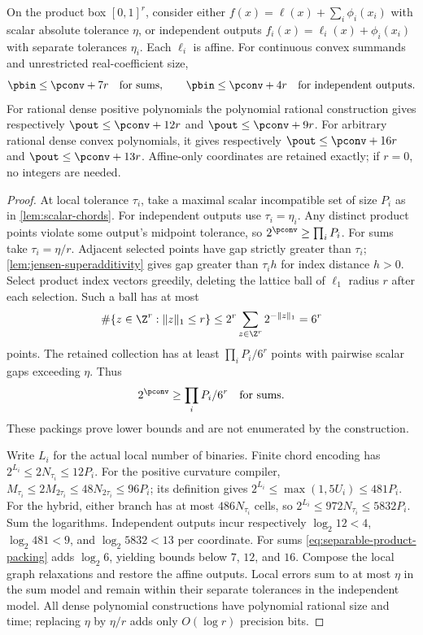 \begin{theorem}\label{thm:separable-scalar}
On the product box $[0,1]^r$, consider either
$f(x)=\ell(x)+\sum_i\phi_i(x_i)$ with scalar absolute tolerance
$\eta$, or independent outputs $f_i(x)=\ell_i(x)+\phi_i(x_i)$
with separate tolerances $\eta_i$. Each $\ell_i$ is affine. For
continuous convex summands and unrestricted real-coefficient size,
\begin{equation}\label{eq:separable-finite-counts}
 \pbin\le\pconv+7r\quad\text{for sums},\qquad
 \pbin\le\pconv+4r\quad\text{for independent outputs}.
\end{equation}
For rational dense positive polynomials the polynomial rational
construction gives respectively $\pout\le\pconv+12r$ and
$\pout\le\pconv+9r$. For arbitrary rational dense convex polynomials,
it gives respectively $\pout\le\pconv+16r$ and
$\pout\le\pconv+13r$. Affine-only coordinates are retained exactly;
if $r=0$, no integers are needed.
\end{theorem}
\begin{proof}
At local tolerance $\tau_i$, take a maximal scalar incompatible set
of size $P_i$ as in \cref{lem:scalar-chords}. For independent outputs
use $\tau_i=\eta_i$. Any distinct product points violate some output's
midpoint tolerance, so $2^{\pconv}\ge\prod_iP_i$.
For sums take $\tau_i=\eta/r$. Adjacent selected points have gap
strictly greater than $\tau_i$; \cref{lem:jensen-superadditivity}
gives gap greater than $\tau_i h$ for index distance $h>0$.
Select product index vectors greedily, deleting the lattice ball of
$\ell_1$ radius $r$ after each selection. Such a ball has at most
\[
 \#\{z\in\Z^r:\|z\|_1\le r\}
 \le2^r\sum_{z\in\Z^r}2^{-\|z\|_1}=6^r
\]
points. The retained collection has at least $\prod_iP_i/6^r$
points with pairwise scalar gaps exceeding $\eta$. Thus
\begin{equation}\label{eq:separable-product-packing}
 2^{\pconv}\ge\prod_iP_i/6^r\quad\text{for sums}.
\end{equation}
These packings prove lower bounds and are not enumerated by the
construction.

Write $L_i$ for the actual local number of binaries. Finite chord
encoding has $2^{L_i}\le2N_{\tau_i}\le12P_i$. For the positive
curvature compiler,
$M_{\tau_i}\le2M_{2\tau_i}\le48N_{2\tau_i}\le96P_i$;
its definition gives $2^{L_i}\le\max(1,5U_i)\le481P_i$.
For the hybrid, either branch has at most $486N_{\tau_i}$ cells,
so $2^{L_i}\le972N_{\tau_i}\le5832P_i$.
Sum the logarithms. Independent outputs incur respectively
$\log_2 12<4$, $\log_2 481<9$, and $\log_2 5832<13$ per
coordinate. For sums \eqref{eq:separable-product-packing} adds
$\log_2 6$, yielding bounds below $7$, $12$, and $16$.
Compose the local graph relaxations and restore the affine outputs.
Local errors sum to at most $\eta$ in the sum model and remain within
their separate tolerances in the independent model. All dense
polynomial constructions have polynomial rational size and time;
replacing $\eta$ by $\eta/r$ adds only $O(\log r)$ precision bits.
\end{proof}

